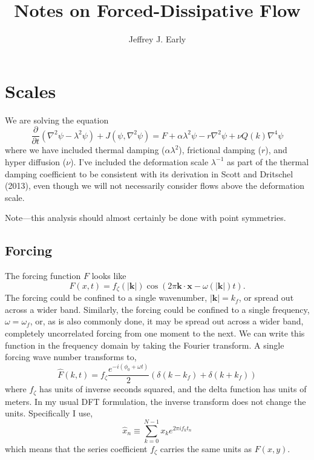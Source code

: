 \documentclass[11pt]{article}
\title{Notes on Forced-Dissipative Flow}
\author{Jeffrey J. Early}
\begin{document}
\maketitle


\section{Scales}

We are solving the equation
\begin{equation}
\frac{\partial }{\partial t} \left( \nabla^2 \psi - \lambda^2 \psi \right)  + J\left( \psi, \nabla^2 \psi \right) = F + \alpha \lambda^2 \psi -r \nabla^2 \psi + \nu Q(k) \nabla^4 \psi 
\end{equation}
where we have included thermal damping ($\alpha \lambda^2$), frictional damping ($r$), and hyper diffusion ($\nu$). I've included the deformation scale $\lambda^{-1}$ as part of the thermal damping coefficient to be consistent with its derivation in Scott and Dritschel (2013), even though we will not necessarily consider flows above the deformation scale.

Note---this analysis should almost certainly be done with point symmetries.

%
\subsection{Forcing}
%

The forcing function $F$ looks like
\begin{equation}
F(x,t) = f_\zeta(|\mathbf{k}|) \cos \left( 2\pi \mathbf{k} \cdot \mathbf{x} - \omega(|\mathbf{k}|)t \right).
\end{equation}
The forcing could be confined to a single wavenumber, $|\mathbf{k}|= k_f$, or spread out across a wider band. Similarly, the forcing could be confined to a single frequency, $\omega=\omega_f$, or, as is also commonly done, it may be spread out across a wider band, completely uncorrelated forcing from one moment to the next. We can write this function in the frequency domain by taking the Fourier transform. A single forcing wave number transforms to,
\begin{equation}
\hat{F}(k,t) = f_\zeta \frac{e^{- i \left( \phi_0+\omega t\right)}}{2} \left( \delta \left(k -k_f\right) + \delta\left(k + k_f\right)  \right)
\end{equation}
where $f_\zeta$ has units of inverse seconds squared, and the delta function has units of meters. In my usual DFT formulation, the inverse transform does not change the units. Specifically I use,
\begin{equation}
\hat{x}_n \equiv \sum_{k=0}^{N-1} x_k e^{2\pi i f_k t_n}
\end{equation}
which means that the series coefficient $f_\zeta$ carries the same units as $F(x,y)$.
\end{document}

